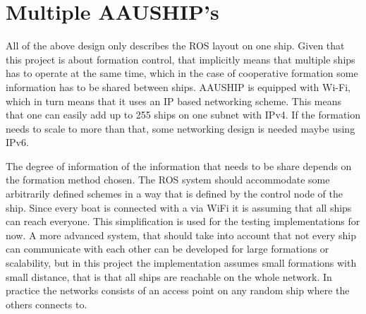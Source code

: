 
\section{Multiple AAUSHIP's}
All of the above design only describes the ROS layout on one ship.
Given that this project is about formation control, that implicitly
means that multiple ships has to operate at the same time, which in
the case of cooperative formation some information has to be shared
between ships. AAUSHIP is equipped with Wi-Fi, which in turn means that
it uses an \ac{IP} based networking scheme. This means that one can
easily add up to 255 ships on one subnet with \ac{IPv4}. If the
formation needs to scale to more than that, some networking design is
needed maybe using \ac{IPv6}.

The degree of information of the information that needs to be share
depends on the formation method chosen. The \ac{ROS} system should
accommodate some arbitrarily defined schemes in a way that is defined
by the control node of the ship. Since every boat is connected with a
via WiFi it is assuming that all ships can reach everyone. This
simplification is used for the testing implementations for now. A more
advanced system, that should take into account that not every ship can
communicate with each other can be developed for large formations or
scalability, but in this project the implementation assumes small
formations with small distance, that is that all ships are reachable
on the whole network. In practice the networks consists of an access
point on any random ship where the others connects to.
